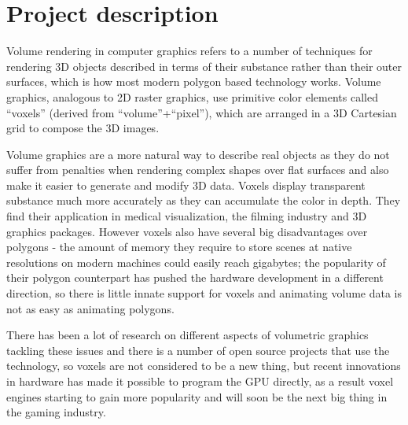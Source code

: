 \documentclass[11pt,fleqn,twoside]{article}
\begin{document}

\mmp

\setcounter{tocdepth}{3} %


\section{Project description}
Volume rendering in computer graphics refers to a number of techniques for rendering 3D objects described in terms of their substance rather than their outer surfaces, which is how most modern polygon based technology works. Volume graphics, analogous to 2D raster graphics, use primitive color elements called ``voxels'' (derived from ``volume''+``pixel''), which are arranged in a 3D Cartesian grid to compose the 3D images.

Volume graphics are a more natural way to describe real objects as they do not suffer from penalties when rendering complex shapes over flat surfaces and also make it easier to generate and modify 3D data. Voxels display transparent substance much more accurately as they can accumulate the color in depth. They find their application in medical visualization, the filming industry and 3D graphics packages. However voxels also have several big disadvantages over polygons - the amount of memory they require to store scenes at native resolutions on modern machines could easily reach gigabytes; the popularity of their polygon counterpart has pushed the hardware development in a different direction, so there is little innate support for voxels and animating volume data is not as easy as animating polygons.

There has been a lot of research on different aspects of volumetric graphics tackling these issues and there is a number of open source projects that use the technology, so voxels are not considered to be a new thing, but recent innovations in hardware has made it possible to program the GPU directly, as a result voxel engines starting to gain more popularity and will soon be the next big thing in the gaming industry.
\end{document}
